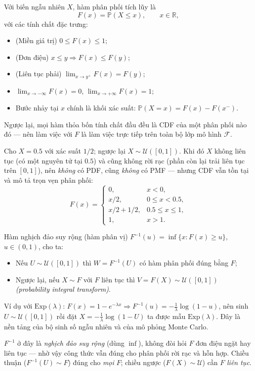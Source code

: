 Với biến ngẫu nhiên $X$, hàm phân phối tích lũy là
\[ F(x)=\mathbb{P}(X\le x),\qquad x\in\mathbb{R}, \]
với các tính chất đặc trưng:
\begin{itemize}
\item (Miền giá trị) $0\le F(x)\le 1$;
\item (Đơn điệu) $x\le y \Rightarrow F(x)\le F(y)$;
\item (Liên tục phải) $\lim_{x\to y^{+}}F(x)=F(y)$;
\item $\lim_{x\to-\infty}F(x)=0$, $\lim_{x\to+\infty}F(x)=1$;
\item Bước nhảy tại $x$ chính là khối xác suất: $\mathbb{P}(X=x)=F(x)-F(x^{-})$.
\end{itemize}
Ngược lại, mọi hàm thỏa bốn tính chất đầu đều là CDF của một phân phối nào đó --- nên làm việc với $F$ là làm việc trực tiếp trên toàn bộ lớp mô hình $\mathcal{F}$.

Cho $X=0.5$ với xác suất $1/2$; ngược lại $X\sim \mathcal{U}([0,1])$. Khi đó $X$ không liên tục (có một nguyên tử tại $0.5$) và cũng không rời rạc (phần còn lại trải liên tục trên $[0,1]$), nên \emph{không} có PDF, cũng \emph{không} có PMF --- nhưng CDF vẫn tồn tại và mô tả trọn vẹn phân phối:
\[
F(x)=\begin{cases}
0, & x<0,\\
x/2, & 0\le x<0.5,\\
x/2+1/2, & 0.5\le x\le 1,\\
1, & x>1.
\end{cases}
\]

Hàm nghịch đảo suy rộng (hàm phân vị) $F^{-1}(u)=\inf\{x: F(x)\ge u\}$, $u\in(0,1)$, cho ta:
\begin{itemize}
\item Nếu $U\sim \mathcal{U}([0,1])$ thì $W=F^{-1}(U)$ có hàm phân phối đúng bằng $F$;
\item Ngược lại, nếu $X\sim F$ với $F$ liên tục thì $V=F(X)\sim \mathcal{U}([0,1])$ \textit{(probability integral transform)}.
\end{itemize}
Ví dụ với $\mathrm{Exp}(\lambda)$: $F(x)=1-e^{-\lambda x}\Rightarrow F^{-1}(u)=-\tfrac{1}{\lambda}\log(1-u)$, nên sinh $U\sim\mathcal{U}([0,1])$ rồi đặt $X=-\tfrac{1}{\lambda}\log(1-U)$ ta được mẫu $\mathrm{Exp}(\lambda)$. Đây là nền tảng của bộ sinh số ngẫu nhiên và của mô phỏng Monte Carlo.

\begin{luuy}
$F^{-1}$ ở đây là \emph{nghịch đảo suy rộng} (dùng $\inf$), không đòi hỏi $F$ đơn điệu ngặt hay liên tục --- nhờ vậy công thức vẫn đúng cho phân phối rời rạc và hỗn hợp. Chiều thuận ($F^{-1}(U)\sim F$) đúng cho \emph{mọi} $F$; chiều ngược ($F(X)\sim\mathcal{U}$) cần $F$ \emph{liên tục}.
\end{luuy}

